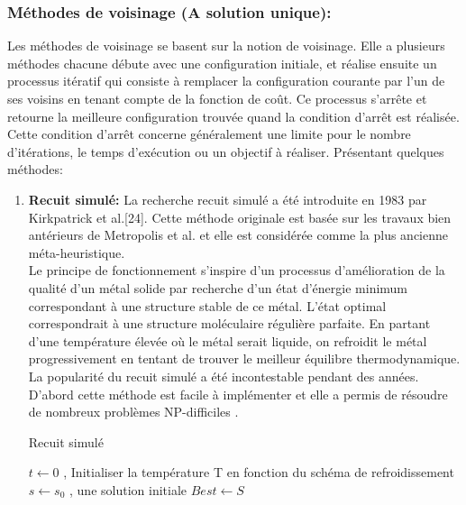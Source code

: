 \subsubsection{Méthodes de voisinage (A solution unique):}
Les méthodes de voisinage se basent sur la notion de voisinage. Elle a plusieurs méthodes chacune débute avec une configuration initiale, et réalise ensuite un processus itératif qui consiste à remplacer la configuration courante par l'un de ses voisins en tenant compte de la fonction de coût. Ce processus s'arrête et retourne la meilleure configuration trouvée quand la condition d'arrêt est réalisée. Cette condition d'arrêt concerne généralement une limite pour le nombre d'itérations, le temps d’exécution ou un objectif à réaliser. Présentant quelques méthodes:

\begin{enumerate}[label=\alph*)]
	\item \textbf{Recuit simulé: } La recherche recuit simulé a été introduite en 1983 par Kirkpatrick et al.[24]. Cette méthode originale est basée sur les travaux bien antérieurs de Metropolis et al. \cite{metropolis1953equation} et elle est considérée comme la plus ancienne méta-heuristique.\\
Le principe de fonctionnement s’inspire d’un processus d’amélioration de la qualité d’un métal solide par recherche d’un état d’énergie minimum correspondant à une structure stable de ce métal. L’état optimal correspondrait à une structure moléculaire régulière parfaite. En partant d’une température élevée où le métal serait liquide, on refroidit le métal progressivement en tentant de trouver le meilleur équilibre thermodynamique.\\
La popularité du recuit simulé a été incontestable pendant des années. D’abord cette méthode est facile à implémenter et elle a permis de résoudre de nombreux problèmes NP-difficiles \cite{bonomi1984n,vidal1993applied}.\\


\begin{algorithm}[H]
\caption{Recuit simulé }
\SetAlgoLined
\DontPrintSemicolon
$ t \gets 0 $ , Initialiser la température T en fonction du schéma de refroidissement \;
$ s\gets s_0 $ , une solution initiale \;
$ Best \gets S $ \;
\end{algorithm}


\end{enumerate}
